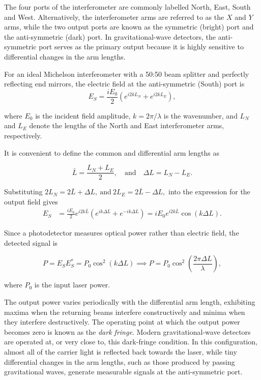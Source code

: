 \documentclass{report}
\begin{document}
The four ports of the interferometer are commonly labelled North, East, South and West. Alternatively, the interferometer arms are referred to as the $X$ and $Y$ arms, while the two output ports are known as the symmetric (bright) port and the anti-symmetric (dark) port. In gravitational-wave detectors, the anti-symmetric port serves as the primary output because it is highly sensitive to differential changes in the arm lengths.

For an ideal Michelson interferometer with a 50:50 beam splitter and perfectly reflecting end mirrors, the electric field at the anti-symmetric (South) port is
\begin{equation}
E_S
=
\frac{iE_0}{2}
\left(
e^{i2kL_N}
+
e^{i2kL_E}
\right),
\end{equation}

where $E_0$ is the incident field amplitude, $k=2\pi/\lambda$ is the wavenumber, and $L_N$ and $L_E$ denote the lengths of the North and East interferometer arms, respectively.

It is convenient to define the common and differential arm lengths as

\begin{equation}
\bar{L}
=
\frac{L_N+L_E}{2},
\quad
\text{and}
\quad
\Delta L
=
L_N-L_E.
\end{equation}

Substituting
$2L_N = 2\bar{L}+\Delta L,
\ \text{and} \ 
2L_E = 2\bar{L}-\Delta L,$ into the expression for the output field gives
\begin{align}
E_S
&=
\frac{iE_0}{2}
e^{i2k\bar{L}}
\left(
e^{ik\Delta L}
+
e^{-ik\Delta L}
\right) =
iE_0
e^{i2k\bar{L}}
\cos(k\Delta L).
\end{align}

Since a photodetector measures optical power rather than electric field, the detected signal is

\begin{equation}
P
=
E_SE_S^{*}
=
P_0
\cos^2(k\Delta L)
\implies
P
=
P_0
\cos^2
\left(
\frac{2\pi\Delta L}{\lambda}
\right),
\end{equation}

where $P_0$ is the input laser power.

The output power varies periodically with the differential arm length, exhibiting maxima when the returning beams interfere constructively and minima when they interfere destructively. The operating point at which the output power becomes zero is known as the \textit{dark fringe}. Modern gravitational-wave detectors are operated at, or very close to, this dark-fringe condition. In this configuration, almost all of the carrier light is reflected back towards the laser, while tiny differential changes in the arm lengths, such as those produced by passing gravitational waves, generate measurable signals at the anti-symmetric port.
\end{document}

